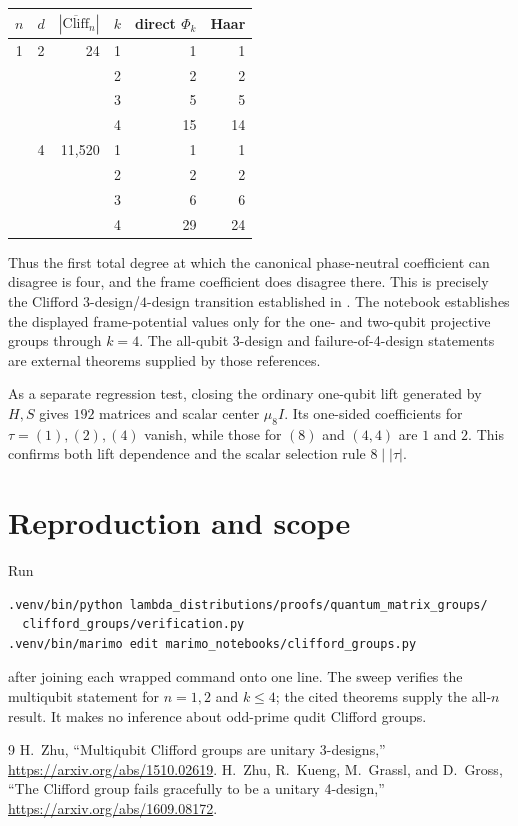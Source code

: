 \documentclass[11pt]{article}
\begin{document}
\begin{center}
\begin{tabular}{@{}ccrrrr@{}}\toprule
$n$&$d$&$|\overline{\mathrm{Cliff}}_n|$&$k$&direct $\Phi_k$&Haar\\\midrule
1&2&24&1&1&1\\
 &&&2&2&2\\
 &&&3&5&5\\
 &&&4&15&14\\\addlinespace
2&4&11,520&1&1&1\\
 &&&2&2&2\\
 &&&3&6&6\\
 &&&4&29&24\\\bottomrule
\end{tabular}
\end{center}
Thus the first total degree at which the canonical phase-neutral coefficient
can disagree is four, and the frame coefficient does disagree there.
This is precisely the Clifford $3$-design/$4$-design transition established
in \cite{zhu3design,graceful}.
The notebook establishes the displayed frame-potential values only for the
one- and two-qubit projective groups through $k=4$.  The all-qubit 3-design
and failure-of-4-design statements are external theorems supplied by those
references.

As a separate regression test, closing the ordinary one-qubit lift generated
by $H,S$ gives $192$ matrices and scalar center $\mu_8I$.  Its one-sided
coefficients for $\tau=(1),(2),(4)$ vanish, while those for $(8)$ and $(4,4)$
are $1$ and $2$.  This confirms both lift dependence and the scalar selection
rule $8\mid|\tau|$.

\section{Reproduction and scope}
Run
\begin{verbatim}
.venv/bin/python lambda_distributions/proofs/quantum_matrix_groups/
  clifford_groups/verification.py
.venv/bin/marimo edit marimo_notebooks/clifford_groups.py
\end{verbatim}
after joining each wrapped command onto one line.  The sweep verifies the
multiqubit statement for $n=1,2$ and $k\leq4$; the cited theorems supply the
all-$n$ result.  It makes no inference about odd-prime qudit Clifford groups.

\begin{thebibliography}{9}
 H.~Zhu, ``Multiqubit Clifford groups are unitary
3-designs,'' \url{https://arxiv.org/abs/1510.02619}.
 H.~Zhu, R.~Kueng, M.~Grassl, and D.~Gross,
``The Clifford group fails gracefully to be a unitary 4-design,''
\url{https://arxiv.org/abs/1609.08172}.
\end{thebibliography}
\end{document}
